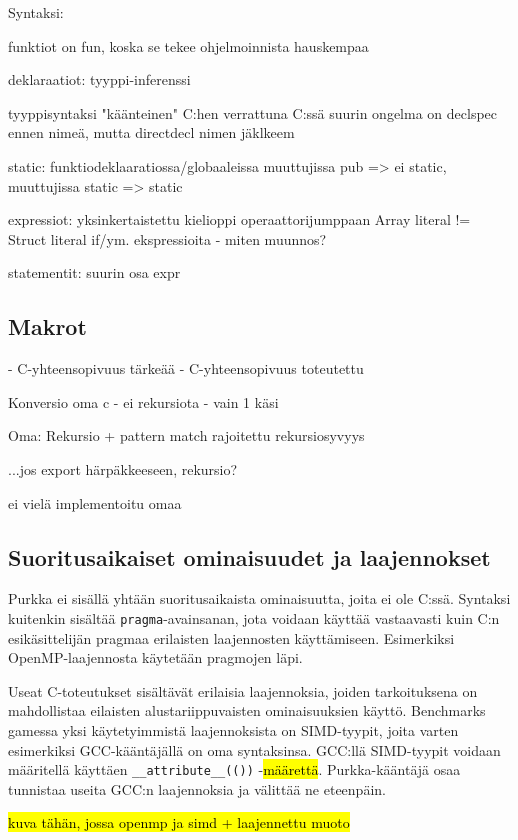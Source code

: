 Syntaksi:

funktiot on fun, koska se tekee ohjelmoinnista hauskempaa

deklaraatiot: tyyppi-inferenssi

tyyppisyntaksi "käänteinen" C:hen verrattuna
C:ssä suurin ongelma on declspec ennen nimeä, mutta directdecl nimen jäklkeem

static:
    funktiodeklaaratiossa/globaaleissa muuttujissa pub => ei static,
    muuttujissa static => static

expressiot:
    yksinkertaistettu kielioppi operaattorijumppaan
    Array literal != Struct literal
    if/ym. ekspressioita
        - miten muunnos?

statementit:
    suurin osa expr

\subsection{Makrot}

- C-yhteensopivuus tärkeää
- C-yhteensopivuus toteutettu

Konversio oma c
- ei rekursiota
- vain 1 käsi

Oma:
Rekursio + pattern match
rajoitettu rekursiosyvyys

...jos export härpäkkeeseen, rekursio?

ei vielä implementoitu omaa

\subsection{Suoritusaikaiset ominaisuudet ja laajennokset}

Purkka ei sisällä yhtään suoritusaikaista ominaisuutta, joita ei ole C:ssä.
Syntaksi kuitenkin sisältää \texttt{pragma}-avainsanan, jota voidaan käyttää
vastaavasti kuin C:n esikäsittelijän pragmaa erilaisten laajennosten
käyttämiseen. Esimerkiksi OpenMP-laajennosta käytetään pragmojen läpi.

Useat C-toteutukset sisältävät erilaisia laajennoksia, joiden tarkoituksena on
mahdollistaa eilaisten alustariippuvaisten ominaisuuksien käyttö. Benchmarks
gamessa yksi käytetyimmistä laajennoksista on SIMD-tyypit, joita varten
esimerkiksi GCC-kääntäjällä on oma syntaksinsa. GCC:llä SIMD-tyypit voidaan
määritellä käyttäen \texttt{\_\_attribute\_\_(())} -\hl{määrettä}.
Purkka-kääntäjä osaa tunnistaa useita GCC:n laajennoksia ja välittää ne
eteenpäin.

\hl{kuva tähän, jossa openmp ja simd + laajennettu muoto}

